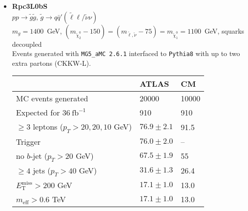 \documentclass[10pt,fleqn]{article}
\newcommand{\met}{E^\mathrm{miss}_\mathrm{T}}
\newcommand{\meff}{m_\mathrm{eff}}
\begin{document}
\begin{itemize}
\item \textbf{Rpc3L0bS}\\ $ p p \to \tilde{g} \tilde{g} $, $\tilde{g} \to q \bar{q}'(\tilde{\ell}\ell/\tilde{\nu}\nu)$\\
 $m_{g} = 1400$~GeV, $(m_{\tilde{\chi}_2^0} - 150) = (m_{\tilde{\ell},\tilde{\nu}} - 75) = m_{\tilde{\chi}_1^0} = 1100$~GeV, squarks decoupled\\
 Events generated with \texttt{MG5\_aMC 2.6.1} interfaced to \texttt{Pythia8} with up to two extra partons (CKKW-L).
 \begin{tabular}{l|p{3cm}|p{3cm}} \toprule
                                           &  ATLAS           & CM  \\ \midrule
 MC events generated                       &  20000          & 10000 \\ \midrule
 Expected for $36\ \mathrm{fb}^{-1}$       &  910            & 910  \\
 $\geq 3$ leptons ($p_T > 20, 20, 10$ GeV) & $76.9\pm 2.1$   & 91.5  \\
 Trigger                                   & $76.0\pm 2.0$   &  --\\
 no $b$-jet ($p_T > 20$ GeV)               & $67.5\pm 1.9$   &  55\\
 $\geq 4$ jets ($p_T > 40$ GeV)            & $31.6\pm 1.3$   &  26.4\\
 $\met  > 200$ GeV                         & $17.1\pm 1.0$   &  13.0\\
 $\meff > 0.6$ TeV                         & $17.1\pm 1.0$   &  13.0\\   \bottomrule
 \end{tabular}    


\end{itemize}
\end{document}
